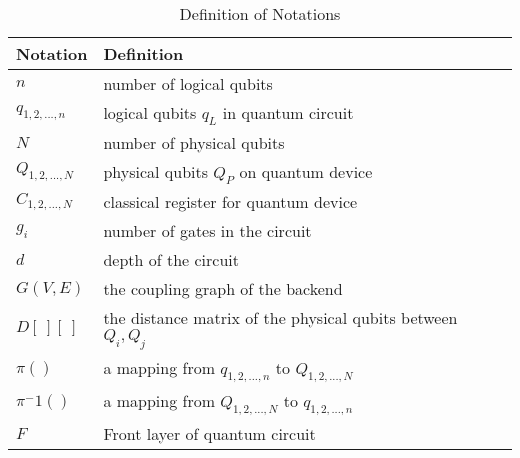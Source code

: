 \begin{table}[htb]
\centering
\caption{Definition of Notations}
\label{tab:definition-notation}
\begin{tabular}{|l|l|} 
\hline
\textbf{Notation} & \textbf{Definition}                                            \\ 
\hline
$n$               & number of logical qubits                                       \\ 
\hline
$q_{1,2,...,n}$     & logical qubits $q_L$ in quantum circuit                        \\ 
\hline
$N$               & number of physical qubits                                      \\ 
\hline
$Q_{1,2,...,N}$     & physical qubits $Q_P$ on quantum device                        \\ 
\hline
$C_{1,2,...,N}$     & classical register for quantum device                          \\ 
\hline
$g_i$             & number of gates in the circuit                                 \\ 
\hline
$d$               & depth of the circuit                                           \\ 
\hline
$G(V, E)$         & the coupling graph of the backend                              \\ 
\hline
$D[\ ][\ ]$       & the distance matrix of the physical qubits between $Q_i, Q_j$  \\ 
\hline
$\pi()$           & a mapping from $q_{1,2,...,n}$ to $Q_{1,2,...,N}$                  \\ 
\hline
$\pi^-1()$        & a mapping from $Q_{1,2,...,N}$ to $q_{1,2,...,n}$                  \\ 
\hline
$F$               & Front layer of quantum circuit                                 \\
\hline
\end{tabular}
\end{table}